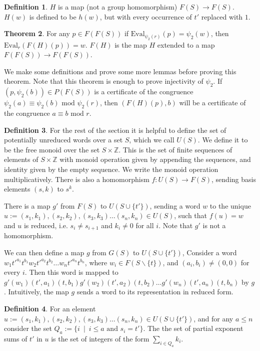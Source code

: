 \documentclass[12pt]{article} %
\theoremstyle{definition}
\newtheorem{thm}{Theorem}[subsubsection]
\theoremstyle{definition}
\theoremstyle{definition}
\theoremstyle{definition}
\newtheorem{defn}[thm]{Definition}
\begin{document}
\begin{defn} \label{PowProof}
  $H$ is a map (not a group homomorphism) $F(S) \to F(S)$. $H(w)$ is defined to be
  $h(w)$, but with every occurrence of $t'$ replaced with $1$.
\end{defn}

\begin{thm}\label{powproof}
  For any $p \in F(F(S))$ if $\text{Eval}_{\psi_2(r)}(p) = \psi_2(w)$,
  then $\text{Eval}_r(F(H)(p)) = w$. $F(H)$ is the map $H$ extended to a map
  $F(F(S)) \to F(F(S))$.
\end{thm}

We make some definitions and prove some more lemmas before proving this theorem.
Note that this theorem is enough to prove injectivity of $\psi_2$.
If $(p, \psi_2(b)) \in P(F(S))$ is a certificate of the congruence
$\psi_2(a) \equiv \psi_2(b) \text{ mod }\psi_2(r)$, then
$(F(H)(p), b)$ will be a certificate of the congruence $a \equiv b \text{ mod } r$.

\begin{defn}
  For the rest of the section it is helpful to define the set of potentially unreduced
  words over a set $S$, which we call $U(S)$.
  We define it to be the free monoid over the set $S \times \mathbb{Z}$.
  This is the set of finite sequences of elements of $S \times \mathbb{Z}$ with monoid operation
  given by appending the sequences, and identity given by the empty sequence. We write
  the monoid operation multiplicatively.
  There is also a homomorphism $f : U(S) \to F(S)$, sending basis elements $(s, k)$ to
  $s^k$.
\end{defn}

There is a map $g'$ from $F(S)$ to $U(S \cup \{t'\})$, sending a word $w$ to the unique
$u := (s_1, k_1), (s_2, k_2), (s_3, k_3) \dots (s_n, k_n) \in U(S)$, such that
$f(u) = w$ and $u$ is reduced, i.e. $s_i \ne s_{i+1}$ and $k_i \ne 0$ for all $i$.
Note that $g'$ is not a homomorphism.

We can then define a map $g$ from $G(S)$ to $U(S \cup \{t'\})$,
Consider a word $w_1t'^{a_1}t^{b_1}w_2t'^{a_2}t^{b_2} \dots w_nt'^{a_n}t^{b_n}$, where
$w_i \in F(S \backslash \{t\})$, and $(a_i, b_i) \ne (0, 0)$ for every $i$.
Then this word is mapped to $g'(w_1)(t', a_1)(t, b_1)g'(w_2)(t', a_2)(t, b_2) \dots
g'(w_n)(t', a_n)(t, b_n)$ by $g$. Intuitively, the map $g$ sends a word to its
representation in reduced form.

\begin{defn}
  For an element $u := (s_1, k_1), (s_2, k_2), (s_3, k_3) \dots (s_n, k_n) \in U(S \cup \{t'\})$,
  and for any $a \le n$
  consider the set $Q_a := \{ i \ \mid \ i \le a \text{ and } s_i = t' \}$.
  The the set of partial exponent sums of $t'$ in $u$ is the set of integers of the
  form $\sum_{i \in Q_a} k_i$.
\end{defn}
\end{document}
